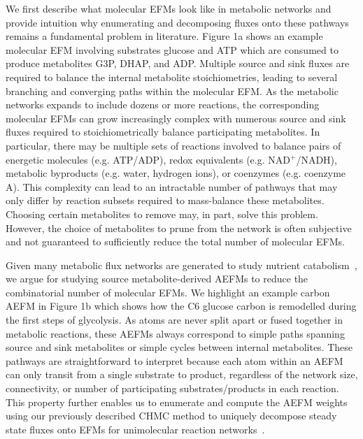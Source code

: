 \documentclass[12pt]{article}
\begin{document}
We first describe what molecular EFMs look like in metabolic networks and
provide intuition why enumerating and decomposing fluxes onto these
pathways remains a fundamental problem in literature. Figure 1a shows an
example molecular EFM involving substrates glucose and ATP which are
consumed to produce metabolites G3P, DHAP, and ADP. Multiple source and
sink fluxes are required to balance the internal metabolite
stoichiometries, leading to several branching and converging paths within
the molecular EFM. As the metabolic networks expands to include dozens or
more reactions, the corresponding molecular EFMs can grow increasingly
complex with numerous source and sink fluxes required to
stoichiometrically balance participating metabolites. In particular, there
may be multiple sets of reactions involved to balance pairs of energetic
molecules (e.g. ATP/ADP), redox equivalents (e.g. NAD$^+$/NADH), metabolic
byproducts (e.g. water, hydrogen ions), or coenzymes (e.g. coenzyme A).
This complexity can lead to an intractable number of pathways that may
only differ by reaction subsets required to mass-balance these
metabolites. Choosing certain metabolites to remove may, in part, solve
this problem. However, the choice of metabolites to prune from the network
is often subjective and not guaranteed to sufficiently reduce the total
number of molecular EFMs.

Given many metabolic flux networks are generated to study nutrient
catabolism~\citep{ZamboniNicola2015DtMS}, we argue for studying source
metabolite-derived AEFMs to reduce the combinatorial number of molecular
EFMs. We highlight an example carbon AEFM in Figure 1b which shows how
the C6 glucose carbon is remodelled during the first steps of glycolysis.
As atoms are never split apart or fused together in metabolic reactions,
these AEFMs always correspond to simple paths spanning source and sink
metabolites or simple cycles between internal metabolites. These pathways
are straightforward to interpret because each atom within an AEFM can only
transit from a single substrate to product, regardless of the network
size, connectivity, or number of participating substrates/products in each
reaction. This property further enables us to enumerate and compute the
AEFM weights using our previously described CHMC method to uniquely
decompose steady state fluxes onto EFMs for unimolecular reaction
networks~\citep{ChitpinJustinG2023AMct}.
\end{document}
